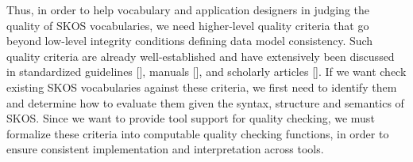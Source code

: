Thus, in order to help vocabulary and application designers in judging the quality of SKOS vocabularies, we need higher-level quality criteria that go beyond low-level integrity conditions defining data model consistency. Such quality criteria are already well-established and have extensively been discussed in standardized guidelines [], manuals [], and scholarly articles [].
If we want check existing SKOS vocabularies against these criteria, we first need to identify them and determine how to evaluate them given the syntax, structure and semantics of SKOS. Since we want to provide tool support for quality checking, we must formalize these criteria into computable quality checking functions, in order to ensure consistent implementation and interpretation across tools.


% 
